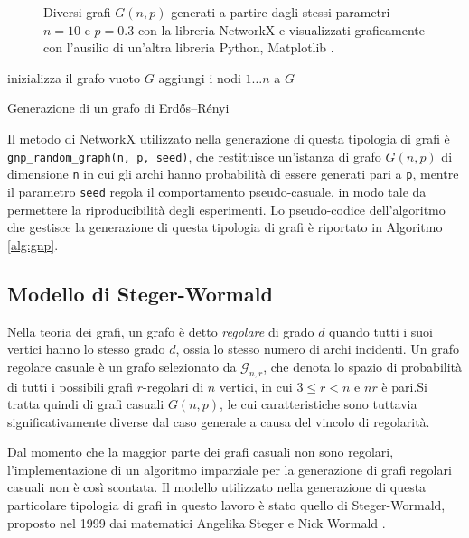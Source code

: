 \begin{figure}[h!]
\begin{subfigure}[b]{0.25\textwidth}
     \end{subfigure}
        \caption{Diversi grafi $G(n,p)$ generati a partire dagli stessi parametri $n=10$ e $p=0.3$ con la libreria NetworkX e visualizzati graficamente con l'ausilio di un'altra libreria Python, Matplotlib \cite{Hunter2007}.}
        \label{fig:gnpes}
\end{figure}

\begin{algorithm}
\SetAlgoLined
{}
 inizializza il grafo vuoto $G$\;
 aggiungi i nodi $1 \dots n$ a $G$\;
 \caption{Generazione di un grafo di Erdős–Rényi}
 \label{alg:gnp}
\end{algorithm}

Il metodo di NetworkX utilizzato nella generazione di questa tipologia di grafi è \linebreak
\texttt{gnp\_random\_graph(n, p, seed)}, che restituisce un'istanza di grafo $G(n,p)$ di dimensione \texttt{n} in cui gli archi hanno probabilità di essere generati pari a \texttt{p}, mentre il parametro \texttt{seed} regola il comportamento pseudo-casuale, in modo tale da permettere la riproducibilità degli esperimenti. Lo pseudo-codice dell'algoritmo che gestisce la generazione di questa tipologia di grafi è riportato in Algoritmo \ref{alg:gnp}.

\subsection{Modello di Steger-Wormald}
Nella teoria dei grafi, un grafo è detto \textit{regolare} di grado $d$ quando tutti i suoi vertici hanno lo stesso grado $d$, ossia lo stesso numero di archi incidenti. Un grafo regolare casuale è un grafo selezionato da $\mathcal{G}_{n,r}$, che denota lo spazio di probabilità di tutti i possibili grafi $r$-regolari di $n$ vertici, in cui $3\leq r < n$ e $nr$ è pari.Si tratta quindi di grafi casuali $G(n,p)$, le cui caratteristiche sono tuttavia significativamente diverse dal caso generale a causa del vincolo di regolarità.

Dal momento che la maggior parte dei grafi casuali non sono regolari, l'implementazione di un algoritmo imparziale per la generazione di grafi regolari casuali non è così scontata. Il modello utilizzato nella generazione di questa particolare tipologia di grafi in questo lavoro è stato quello di Steger-Wormald, proposto nel 1999 dai matematici Angelika Steger e Nick Wormald \cite{steger_wormald_1999}. 



